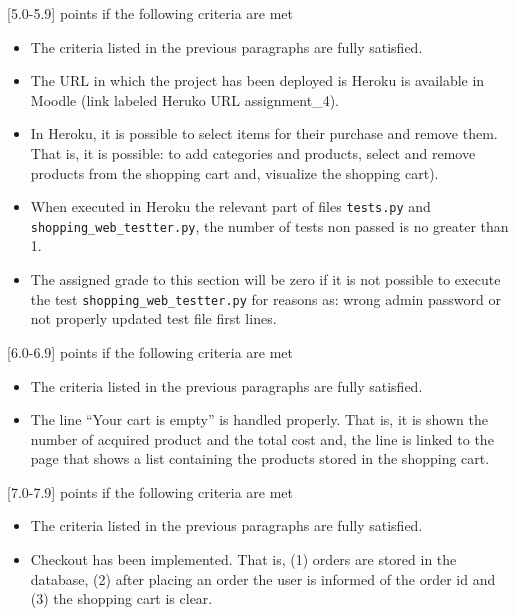 \documentclass[12pt]{article} %
\newcommand{\ttt}[1]{\texttt{#1}}%
\begin{document}
[5.0-5.9] points if the following criteria are met
 \begin{itemize}
 \item The criteria listed in the previous paragraphs are fully satisfied.
 \item The URL in which the project has been deployed is Heroku is available in Moodle (link labeled  Heruko URL assignment\_4).
 \item In Heroku, it is possible to select items for their purchase and remove them. That is, it is possible: to add categories and products, select and remove products from the shopping cart and, visualize the shopping cart).
  \item When executed in Heroku the relevant part of files \ttt{tests.py} and \ttt{shopping\_web\_testter.py}, the number of tests  non passed is no greater than 1.
  \item The assigned grade to this section will be zero if it is not possible to execute the test \ttt{shopping\_web\_testter.py}  for reasons as: wrong admin password or not properly updated test file first lines. 
\end{itemize}

[6.0-6.9] points if the following criteria are met
 \begin{itemize}
 \item The criteria listed in the previous paragraphs are fully satisfied.
 \item The line ``Your cart is empty'' is handled properly. That is, it is shown the number of acquired product and the total cost and, the line is linked to the page that shows a list containing the products stored in the shopping cart. 
 \end{itemize}
 
[7.0-7.9] points if the following criteria are met
 \begin{itemize}
 \item The criteria listed in the previous paragraphs are fully satisfied.
 \item Checkout has been implemented. That is, (1) orders are stored in the database, (2) after placing an order the user is informed of the order id and (3) the shopping cart is clear.
 \end{itemize}
 
\end{document}
